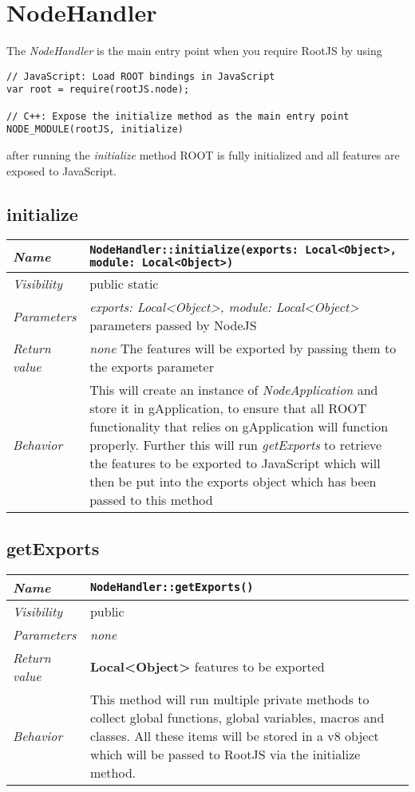 \chapter{NodeHandler}
The \textit{NodeHandler} is the main entry point when you require RootJS by using
\begin{verbatim}
// JavaScript: Load ROOT bindings in JavaScript
var root = require(rootJS.node);

// C++: Expose the initialize method as the main entry point
NODE_MODULE(rootJS, initialize)
\end{verbatim}
after running the \textit{initialize} method ROOT is fully initialized and all features are exposed to JavaScript.
\section{initialize}
\begin{longtable}{p{3cm} @{\hskip 1cm} p{12cm}}
 \hline
\textit{Name} & \texttt{NodeHandler::initialize(exports: Local<Object>, module: Local<Object>)}\\
\hline
 \textit{Visibility} & public static\\
\hline
\textit{Parameters} & \textit{exports: Local<Object>, module: Local<Object>} parameters passed by NodeJS\\
\hline
\textit{Return value} & \textit{none} The features will be exported by passing them to the exports parameter \\
  \hline
 \textit{Behavior} & This will create an instance of \textit{NodeApplication} and store it in gApplication, to ensure that all ROOT functionality that relies on gApplication will function properly.
 Further this will run \textit{getExports} to retrieve the features to be exported to JavaScript which will then be put into the exports object which has been passed to this method \\
\hline
\end{longtable} 
\section{getExports}
\begin{longtable}{p{3cm} @{\hskip 1cm} p{12cm}}
 \hline
\textit{Name} & \texttt{NodeHandler::getExports()}\\
\hline
 \textit{Visibility} & public\\
\hline
\textit{Parameters} & \textit{none}\\
\hline
\textit{Return value} & \textbf{ Local<Object>} features to be exported \\
  \hline
 \textit{Behavior} & This method will run multiple private methods to collect global functions, global variables, macros and classes.
 All these items will be stored in a v8 object which will be passed to RootJS via the initialize method. \\
\hline
\end{longtable} \pagebreak
